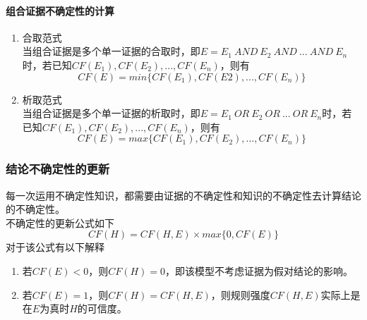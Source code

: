 \documentclass[12pt]{article}
\begin{document}
\paragraph{组合证据不确定性的计算}
\begin{enumerate}
	\item{合取范式\\当组合证据是多个单一证据的合取时，即$E=E_1\ AND\ E_2\ AND\ ...\ AND\ E_n$时，若已知$CF(E_1),CF(E_2),...,CF(E_n)$，则有
			$$CF(E)=min\{CF(E_1),CF(E2),...,CF(E_n)\}$$
		}
	\item{析取范式\\当组合证据是多个单一证据的析取时，即$E=E_1\ OR\ E_2\ OR\ ...\ OR\ E_n$时，若已知$CF(E_1),CF(E_2),...,CF(E_n)$，则有
			$$CF(E)=max\{CF(E_1),CF(E_2),...,CF(E_n)\}$$
		}
\end{enumerate}
\subsubsection{结论不确定性的更新}
每一次运用不确定性知识，都需要由证据的不确定性和知识的不确定性去计算结论的不确定性。\\
不确定性的更新公式如下
$$CF(H)=CF(H,E)\times{ max\{ 0,CF(E) \} }$$
对于该公式有以下解释
\begin{enumerate}
	\item{若$CF(E)<0$，则$CF(H)=0$，即该模型不考虑证据为假对结论的影响。}
	\item{若$CF(E)=1$，则$CF(H)=CF(H,E)$，则规则强度$CF(H,E)$实际上是在$E$为真时$H$的可信度。}
\end{enumerate}
\end{document}
